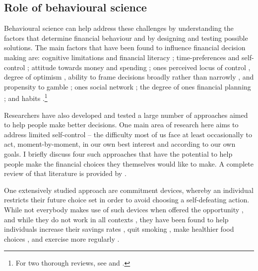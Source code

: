 \subsection{Role of behavioural science}%
\label{sub:role_of_behavioural_science}

Behavioural science can help address these challenges by understanding the
factors that determine financial behaviour and by designing and testing
possible solutions. The main factors that have been found to influence
financial decision making are: cognitive limitations and financial literacy
\citep{agarwal2009age, agarwal2013cognitive, korniotis2011older,
    agarwal2010learning, fernandes2014financial, jorring2020financial};
    time-preferences and self-control \citep{frederick2002time,
    read2018intertemporal, ericson2019intertemporal, cohen2020measuring};
    attitude towards money and spending \citep{rick2008tightwads,
    rick2011fatal}; ones perceived locus of control \citep{perry2005control},
    degree of optimism \citep{puri2007optimism}, ability to frame decisions
    broadly rather than narrowly \citep{kumar2008decision}, and propensity to
    gamble \citep{kumar2009gambles}; ones social network
    \citep{bailey2018economic, kuchler2021social}; the degree of ones financial
    planning \citep{ameriks2003wealth}; and habits
    \citep{blumenstock2018defaults, schaner2018persistent,
        de2013deposit}.\footnote{For two thorough reviews, see
    \citet{agarwal2017shapes} and \citet{greenberg2019financial}.}

Researchers have also developed and tested a large number of approaches aimed
to help people make better decisions. One main area of research here aims to
address limited self-control -- the difficulty most of us face at least
occasionally to act, moment-by-moment, in our own best interest and according
to our own goals. I briefly discuss four such approaches that have the
potential to help people make the financial choices they themselves would like
to make. A complete review of that literature is provided by
\citet{duckworth2018beyond}.

One extensively studied approach are commitment devices, whereby an individual
restricts their future choice set in order to avoid choosing a self-defeating
action. While not everybody makes use of such devices when offered the
opportunity \citep{bryan2010commitment}, and while they do not work in all
contexts \citep{laibson2015don,robinson2018some}, they have been found to help
individuals increase their savings rates \citep{ashraf2006tying}, quit smoking
\citep{gine2010put}, make healthier food choices \citep{schwartz2014healthier},
and exercise more regularly \citep{royer2015incentives}.

